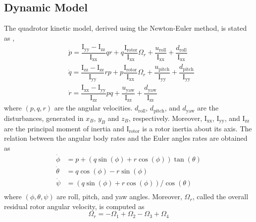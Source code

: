 \documentclass[conference]{IEEEtran}
\begin{document}
\subsection{Dynamic Model}
\noindent The quadrotor kinetic model, derived using the Newton-Euler method, is stated as  \cite{b15}, \cite{b16}
	\begin{align}
		&\dot p = \dfrac{\mathrm{I}_{\text{yy}} - \mathrm{I}_{\text{zz}}}{\mathrm{I}_{\text{xx}}} qr + q \dfrac{\mathrm{I}_{\text{rotor}}}{\mathrm{I}_{\text{xx}}}\Omega_r + \dfrac{u_{\text{roll}}}{\mathrm{I}_{\text{xx}}} + \dfrac{d_{\text{roll}}}{\mathrm{I}_{\text{xx}}}
		\\
	&\dot q = \dfrac{\mathrm{I}_{\text{zz}} - \mathrm{I}_{\text{zz}}}{\mathrm{I}_{\text{yy}}} rp + p \dfrac{\mathrm{I}_{\text{rotor}}}{\mathrm{I}_{\text{xx}}}\Omega_r + \dfrac{u_{\text{pitch}}}{\mathrm{I}_{\text{yy}}} + \dfrac{d_{\text{pitch}}}{\mathrm{I}_{\text{yy}}}
	\\
	&\dot r = \dfrac{\mathrm{I}_{\text{xx}} - \mathrm{I}_{\text{yy}}}{\mathrm{I}_{\text{zz}}} pq  +  \dfrac{u_{\text{yaw}}}{\mathrm{I}_{\text{zz}}} + \dfrac{d_{\text{yaw}}}{\mathrm{I}_{\text{zz}}}
	\end{align}
where $(p, q, r)$ are the angular velocities. $d_{\text{roll}}$, $d_{\text{pitch}}$, and $d_{\text{yaw}}$ are the disturbances, generated in $x_B$, $y_B$ and $z_B$, respectively. Moreover, $\mathrm{I}_{\text{xx}}$, $\mathrm{I}_{\text{yy}}$, and $\mathrm{I}_{\text{zz}}$ are the principal moment of inertia and $\mathrm{I}_{\text{rotor}}$ is a rotor  inertia  about its axis.
The relation between the angular body rates and the Euler angles rates are obtained as
\begin{align}
		\dot\phi &= p + (q\sin(\phi) + r\cos(\phi))\tan(\theta)\\
	\dot \theta &= q\cos(\phi) - r\sin(\phi)\\
	\dot\psi &= (q\sin(\phi) + r\cos(\phi))/{\cos(\theta)}\\
\end{align}
where $(\phi, \theta, \psi)$ are roll, pitch, and yaw angles.
Moreover, $\Omega_r$, called the overall residual rotor angular velocity, is computed as
\begin{equation}
	\Omega_r = -\Omega_1 + \Omega_2 - \Omega_3 + \Omega_4
\end{equation}
\end{document}
